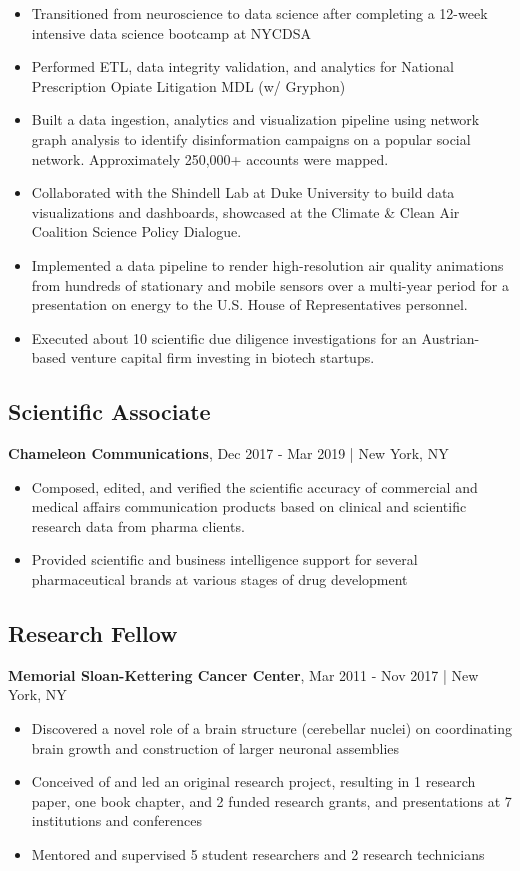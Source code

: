 \documentclass[11pt]{article}
\newenvironment{myitemize}
{ \begin{itemize}
	\setlength{\itemsep}{0pt}
	\setlength{\parskip}{0pt}
	\setlength{\parsep}{0pt}     }
{ \end{itemize}                  }
\begin{document}
\begin{myitemize}
	\item Transitioned from neuroscience to data science after completing a 12-week intensive data science bootcamp at NYCDSA 
	\item Performed ETL, data integrity validation, and analytics for National Prescription Opiate Litigation MDL (w/ Gryphon)
	\item Built a data ingestion, analytics and visualization pipeline using network graph analysis to identify disinformation campaigns on a popular social network. Approximately 250,000+ accounts were mapped.
	\item Collaborated with the Shindell Lab at Duke University to build data visualizations and dashboards, showcased at the Climate \& Clean Air Coalition Science Policy Dialogue.
	\item Implemented a data pipeline to render high-resolution air quality animations from hundreds of stationary and mobile sensors over a multi-year period for a presentation on energy to the U.S. House of Representatives personnel. 
	\item Executed about 10 scientific due diligence investigations for an Austrian-based venture capital firm investing in biotech startups.
\end{myitemize}

\subsection*{Scientific Associate}
\vspace{-3truemm}
{\bfseries Chameleon Communications}, Dec 2017 - Mar 2019 | New York, NY
\begin{myitemize}
	\item Composed, edited, and verified the scientific accuracy of commercial and medical affairs communication products based on clinical and scientific research data from pharma clients.
	\item Provided scientific and business intelligence support for several pharmaceutical brands at various stages of drug development
\end{myitemize}

\subsection*{Research Fellow}
\vspace{-3truemm}
{\bfseries Memorial Sloan-Kettering Cancer Center}, Mar 2011 - Nov 2017 | New York, NY
\begin{myitemize}
	\item Discovered a novel role of a brain structure (cerebellar nuclei) on coordinating brain growth and construction of larger neuronal assemblies
	\item Conceived of and led an original research project, resulting in 1 research paper, one book chapter, and 2 funded research grants, and presentations at 7 institutions and conferences
	\item Mentored and supervised 5 student researchers and 2 research technicians
\end{myitemize}
\end{document}
